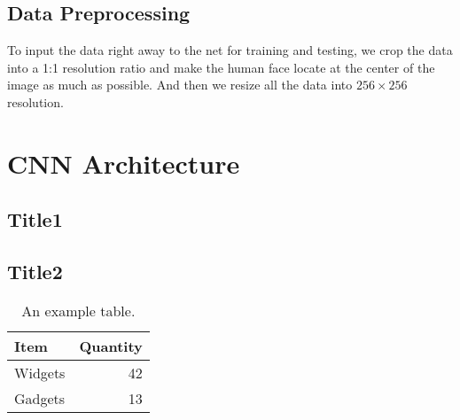 \documentclass[stu, floatsintext, 10pt, donotrepeattitle, natbib]{apa7}
\begin{document}

\subsection{Data Preprocessing}


To input the data right away to the net for training and testing, we crop the data into a 1:1 resolution ratio and make the human face locate at the center of the image as much as possible.
And then we resize all the data into $256 \times 256$ resolution.

\newpage
\section{CNN Architecture}

\subsection{Title1}


\subsection{Title2}

\begin{table}
	\centering
	\begin{tabular}{l|r}
		Item    & Quantity \\\hline
		Widgets & 42       \\
		Gadgets & 13
	\end{tabular}
	\caption{\label{tab:widgets}An example table.}
\end{table}
\end{document}
